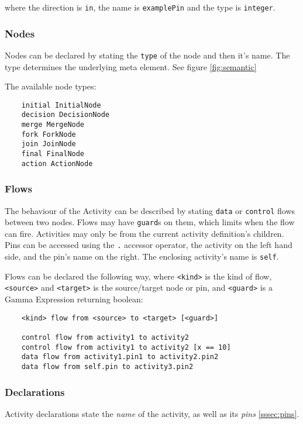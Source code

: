 where the direction is \verb|in|, the name is \verb|examplePin| and the type is \verb|integer|.

\subsubsection*{Nodes}\label{sssec:nodes}

Nodes can be declared by stating the \verb|type| of the node and then it's name. The type determines the underlying meta element. See figure \ref{fig:semantic}

The available node types:

\begin{verbatim}
	initial InitialNode
	decision DecisionNode
	merge MergeNode
	fork ForkNode
	join JoinNode
	final FinalNode
	action ActionNode
\end{verbatim}

\subsubsection*{Flows}\label{sssec:flows}

The behaviour of the Activity can be described by stating \verb|data| or \verb|control| flows between two nodes. Flows may have \verb|guard|s on them, which limits when the flow can fire. Activities may only be from the current activity definition's children. Pins can be accessed using the \verb|.| accessor operator, the activity on the left hand side, and the pin's name on the right. The enclosing activity's name is \verb|self|.

Flows can be declared the following way, where \verb|<kind>| is the kind of flow, \verb|<source>| and \verb|<target>| is the source/target node or pin, and \verb|<guard>| is a Gamma Expression returning boolean:

\begin{verbatim}
	<kind> flow from <source> to <target> [<guard>]
	
	control flow from activity1 to activity2
	control flow from activity1 to activity2 [x == 10]
	data flow from activity1.pin1 to activity2.pin2
	data flow from self.pin to activity3.pin2
\end{verbatim}

\subsubsection*{Declarations}

Activity declarations state the \emph{name} of the activity, as well as its \emph{pins} \ref{sssec:pins}. 


